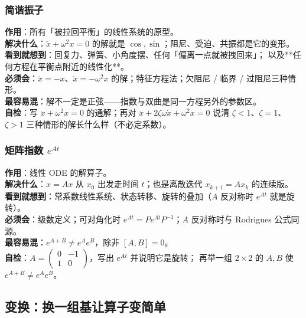 \subsubsection*{简谐振子}
\textbf{作用}：所有「被拉回平衡」的线性系统的原型。\\
\textbf{解决什么}：$\ddot x+\omega^{2}x=0$ 的解就是 $\cos,\sin$；阻尼、受迫、共振都是它的变形。\\
\textbf{看到就想到}：回复力、弹簧、小角度摆、任何「偏离一点就被拽回来」；
以及**任何方程在平衡点附近的线性化**。\\
\textbf{必须会}：$\ddot x=-x$、$\ddot x=-\omega^{2}x$ 的解；特征方程法；欠阻尼 / 临界 / 过阻尼三种情形。\\
\textbf{最容易混}：解不一定是正弦——指数与双曲是同一方程另外的参数区。\\
\textbf{自检}：写 $\ddot x+\omega^{2}x=0$ 的通解；再对 $\ddot x+2\zeta\omega\dot x+\omega^{2}x=0$
说清 $\zeta<1$、$\zeta=1$、$\zeta>1$ 三种情形的解长什么样（不必定系数）。

\subsubsection*{矩阵指数 $e^{At}$}
\textbf{作用}：线性 ODE 的解算子。\\
\textbf{解决什么}：$\dot x=Ax$ 从 $x_{0}$ 出发走时间 $t$；也是离散迭代 $x_{k+1}=Ax_{k}$ 的连续版。\\
\textbf{看到就想到}：常系数线性系统、状态转移、旋转的叠加（$A$ 反对称时 $e^{At}$ 就是旋转）。\\
\textbf{必须会}：级数定义；可对角化时 $e^{At}=Pe^{\Lambda t}P^{-1}$；$A$ 反对称时与 Rodrigues 公式同源。\\
\textbf{最容易混}：$e^{A+B}\ne e^{A}e^{B}$，除非 $[A,B]=0$。\\
\textbf{自检}：$A=\begin{pmatrix}0&-1\\1&0\end{pmatrix}$，写出 $e^{At}$ 并说明它是旋转；
再举一组 $2\times2$ 的 $A,B$ 使 $e^{A+B}\ne e^{A}e^{B}$。

\subsection{变换：换一组基让算子变简单}
\label{app:trans}


